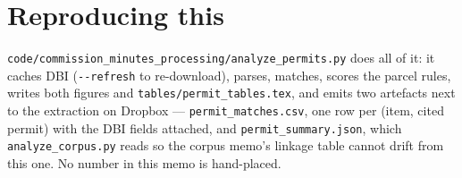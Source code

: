 \documentclass[11pt]{article}
\begin{document}
\section{Reproducing this}

\texttt{code/commission\_minutes\_processing/analyze\_permits.py} does all of it: it caches
DBI (\texttt{-{}-refresh} to re-download), parses, matches, scores the parcel rules, writes
both figures and \texttt{tables/permit\_tables.tex}, and emits two artefacts next to the
extraction on Dropbox --- \texttt{permit\_matches.csv}, one row per (item, cited permit) with
the DBI fields attached, and \texttt{permit\_summary.json}, which
\texttt{analyze\_corpus.py} reads so the corpus memo's linkage table cannot drift from this
one. No number in this memo is hand-placed.
\end{document}
